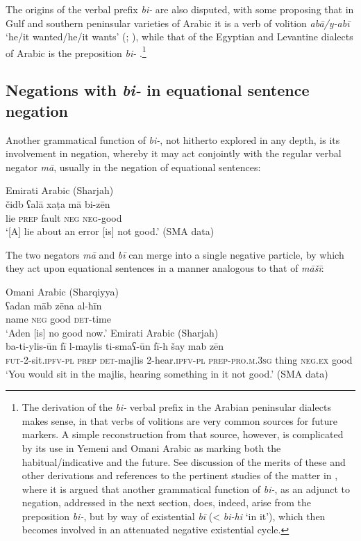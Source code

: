\documentclass[output=paper,colorlinks,citecolor=brown]{langscibook}
\begin{document}
\largerpage[-1]
The origins of the verbal prefix \textit{bi-} are also disputed, with some proposing that in Gulf and southern peninsular varieties of Arabic it is a verb of volition \textit{abā/y-abī} ‘he/it wanted/he/it wants’ (\citealp[67]{retsoe2014a}; \citealp[217--219]{owens2018a}), while that of the Egyptian and Levantine dialects of Arabic is the preposition \textit{bi-} \citep[66, 70]{retsoe2014a}.\footnote{The derivation of the \textit{bi-} verbal prefix in the Arabian peninsular dialects makes sense, in that verbs of volitions are very common sources for future markers. A simple reconstruction from that source, however, is complicated by its use in Yemeni and Omani Arabic as marking both the habitual/indicative and the future. See discussion of the merits of these and other derivations and references to the pertinent studies of the matter in \citet{wilmsen2020b}, where it is argued that another grammatical function of \textit{bi-}, as an adjunct to negation, addressed in the next section, does, indeed, arise from the preposition \textit{bi-}, but by way of existential \textit{bī} (< \textit{bi-hi} ‘in it’), which then becomes involved in an attenuated negative existential cycle.}

\subsection{Negations with \textit{bi-} in equational sentence negation} \label{s:WiAR-4.2}

Another grammatical function of \textit{bi-}, not hitherto explored in any depth, is its involvement in negation, whereby it may act conjointly with the regular verbal negator \textit{mā}, usually in the negation of equational sentences:

\ea Emirati Arabic (Sharjah)\label{ex:WiAR-27}\\
	\gll čidb ʕalā xaṭa mā bi-zēn\\
	lie \textsc{prep} fault \textsc{neg} \textsc{neg}-good\\
	\glt ‘[A] lie about an error [is] not good.’ (SMA data)
\z

The two negators \textit{mā} and \textit{bī} can merge into a single negative particle, by which they act upon equational sentences in a manner analogous to that of \textit{māšī}:

\ea \label{ex:WiAR-28}
  \ea Omani Arabic (Sharqiyya)\\
  	\gll ʕadan māb zēna al-ħīn\\
	name \textsc{neg} good \textsc{det}-time\\
  	\glt ‘Aden [is] no good now.’ \citep[485]{holes2008a}
  \ex Emirati Arabic (Sharjah)\\
  	\gll ba-ti-ylis-ūn fī l-maylis ti-smaʕ-ūn fī-h šay mab zēn\\
  	\textsc{fut}-2-sit.\textsc{ipfv-pl} \textsc{prep} \textsc{det}-majlis 2-hear.\textsc{ipfv-pl} \textsc{prep-pro.m.3sg} thing \textsc{neg.ex} good\\
  	\glt ‘You would sit in the majlis, hearing something in it not good.’ (SMA data)
\z \z
\end{document}
